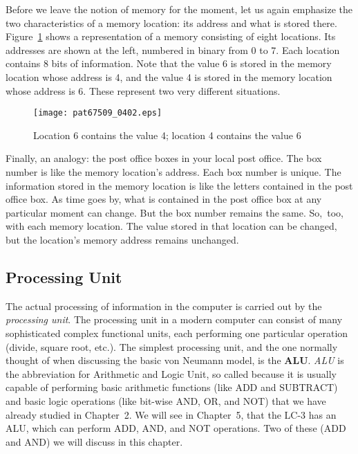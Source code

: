 \documentclass{patt}
\begin{document}
Before we leave the notion of memory for the moment, let us again emphasize
the two characteristics of a memory location: its address and what is stored
there. Figure~\ref{fig:memvalue} shows a representation of a memory consisting 
of eight locations. Its addresses are shown at the left, numbered in binary 
from 0 to 7.  Each location contains 8 bits of information.  Note that the 
value 6 is stored in the memory location whose address is 4, and the value 4 
is stored in the memory location whose address is 6. These
represent two very different situations.

\begin{figure}
\centerline{\texttt{[image: pat67509\_0402.eps]}}
\caption{Location 6 contains the value 4; location 4 contains the value 6}
\label{fig:memvalue}
\vspace{-6pt}
\end{figure}

Finally, an analogy: the post office boxes in your local
post office.  The box number is like the memory location's address.  Each
box number is unique.  The information stored in the memory location is
like the letters contained in the post office box.  As time goes by,
what is contained in the post office box at any particular moment can
change.  But the box number remains the same.  So,~too, with each memory
location.  The value stored in that location can be changed, but the
location's memory address remains unchanged.

\subsection{Processing Unit}
The actual processing of information in the computer is carried out by the
{\em \nobreak processing unit}. The processing unit in a modern
computer can consist of many sophisticated complex functional units, each
performing one particular operation (divide, square root, etc.).  The simplest
processing unit, and the one normally thought of when discussing the basic von
Neumann model, is the {\bf ALU}. {\em ALU} is the abbreviation for Arithmetic
and Logic Unit, so called because
it is usually capable of performing basic arithmetic functions (like ADD and
SUBTRACT) and basic logic operations (like bit-wise AND, OR, and NOT) that we
have already studied in Chapter~2.  We will see in Chapter~5, that the LC-3
has an ALU, which can perform ADD, AND, and NOT operations.  Two of these 
(ADD and AND) we will discuss in this chapter.
\end{document}
